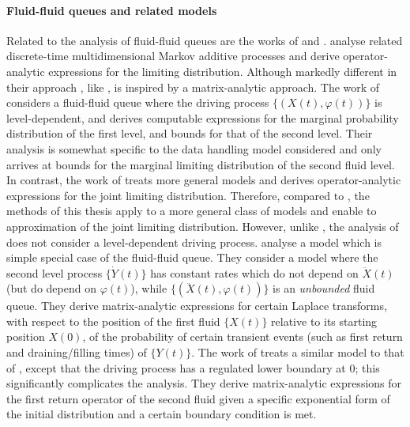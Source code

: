 \paragraph{Fluid-fluid queues and related models} Related to the analysis of fluid-fluid queues are the works of \cite{mz2012,lnp13,bo2013b} and \cite{bop2020}. \cite{mz2012} analyse related discrete-time multidimensional Markov additive processes and derive operator-analytic expressions for the limiting distribution. Although markedly different in their approach \cite{mz2012}, like  \cite{bo2014}, is inspired by a matrix-analytic approach. The work of \cite{lnp13} considers a fluid-fluid queue where the driving process \(\{(X(t),\varphi(t))\}\) is level-dependent, and derives computable expressions for the marginal probability distribution of the first level, and bounds for that of the second level. Their analysis is somewhat specific to the data handling model considered and only arrives at bounds for the marginal limiting distribution of the second fluid level. In contrast, the work of \cite{bo2014} treats more general models and derives operator-analytic expressions for the joint limiting distribution. Therefore, compared to \cite{lnp13}, the methods of this thesis apply to a more general class of models and enable to approximation of the joint limiting distribution. However, unlike \cite{lnp13}, the analysis of \cite{bo2014} does not consider a level-dependent driving process. %
\cite{bo2013b} analyse a model which is simple special case of the fluid-fluid queue. They consider a model where the second level process \(\{\dot Y(t)\}\) has constant rates which do not depend on \(\ddot X(t)\) (but do depend on \(\varphi(t)\)), while \(\{(\ddot X(t),\varphi(t))\}\) is an \emph{unbounded} fluid queue. They derive matrix-analytic expressions for certain Laplace transforms, with respect to the position of the first fluid \(\{X(t)\}\) relative to its starting position \(X(0)\), of the probability of certain transient events (such as first return and draining/filling times) of \(\{Y(t)\}\). %
The work of \cite{bop2020} treats a similar model to that of \cite{bo2013b}, except that the driving process has a regulated lower boundary at \(0\); this significantly complicates the analysis. They derive matrix-analytic expressions for the first return operator of the second fluid given a specific exponential form of the initial distribution and a certain boundary condition is met. %

